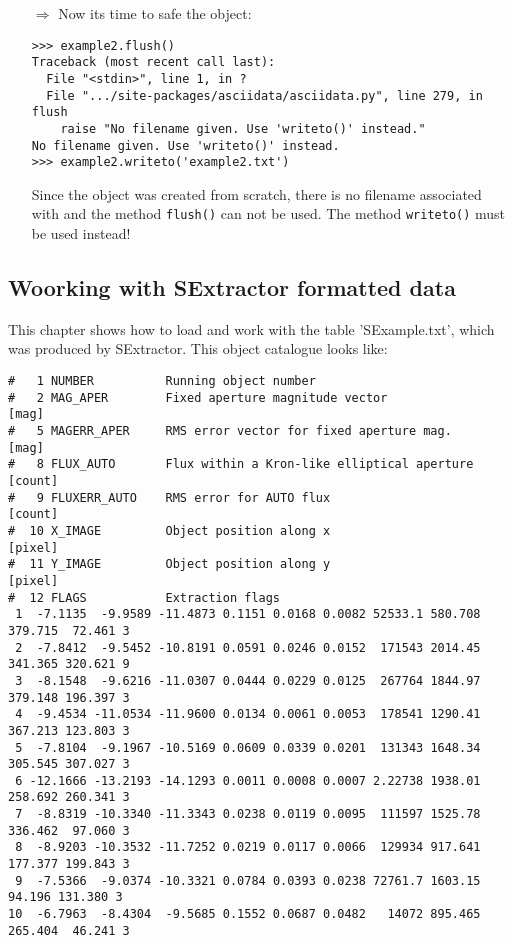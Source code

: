 \begin{itemize}
\item[$\Rightarrow$] Now its time to safe the \ad object:
\begin{small}
\begin{verbatim}
>>> example2.flush()
Traceback (most recent call last):
  File "<stdin>", line 1, in ?
  File ".../site-packages/asciidata/asciidata.py", line 279, in flush
    raise "No filename given. Use 'writeto()' instead."
No filename given. Use 'writeto()' instead.
>>> example2.writeto('example2.txt')
\end{verbatim}
\end{small}
Since the object was created from scratch, there is no filename associated
with and the method {\tt flush()}
can not be used. The method {\tt writeto()}
 must be used instead!

\end{itemize}

\subsection{Woorking with SExtractor formatted data}
\label{SExtractor_data}
This chapter shows how to load and work with the table  'SExample.txt',
which was produced by SExtractor. This object catalogue looks like:

\begin{small}
\begin{verbatim}
#   1 NUMBER          Running object number
#   2 MAG_APER        Fixed aperture magnitude vector                 [mag]
#   5 MAGERR_APER     RMS error vector for fixed aperture mag.        [mag]
#   8 FLUX_AUTO       Flux within a Kron-like elliptical aperture     [count]
#   9 FLUXERR_AUTO    RMS error for AUTO flux                         [count]
#  10 X_IMAGE         Object position along x                         [pixel]
#  11 Y_IMAGE         Object position along y                         [pixel]
#  12 FLAGS           Extraction flags
 1  -7.1135  -9.9589 -11.4873 0.1151 0.0168 0.0082 52533.1 580.708 379.715  72.461 3
 2  -7.8412  -9.5452 -10.8191 0.0591 0.0246 0.0152  171543 2014.45 341.365 320.621 9
 3  -8.1548  -9.6216 -11.0307 0.0444 0.0229 0.0125  267764 1844.97 379.148 196.397 3
 4  -9.4534 -11.0534 -11.9600 0.0134 0.0061 0.0053  178541 1290.41 367.213 123.803 3
 5  -7.8104  -9.1967 -10.5169 0.0609 0.0339 0.0201  131343 1648.34 305.545 307.027 3
 6 -12.1666 -13.2193 -14.1293 0.0011 0.0008 0.0007 2.22738 1938.01 258.692 260.341 3
 7  -8.8319 -10.3340 -11.3343 0.0238 0.0119 0.0095  111597 1525.78 336.462  97.060 3
 8  -8.9203 -10.3532 -11.7252 0.0219 0.0117 0.0066  129934 917.641 177.377 199.843 3
 9  -7.5366  -9.0374 -10.3321 0.0784 0.0393 0.0238 72761.7 1603.15  94.196 131.380 3
10  -6.7963  -8.4304  -9.5685 0.1552 0.0687 0.0482   14072 895.465 265.404  46.241 3
\end{verbatim}
\end{small}

